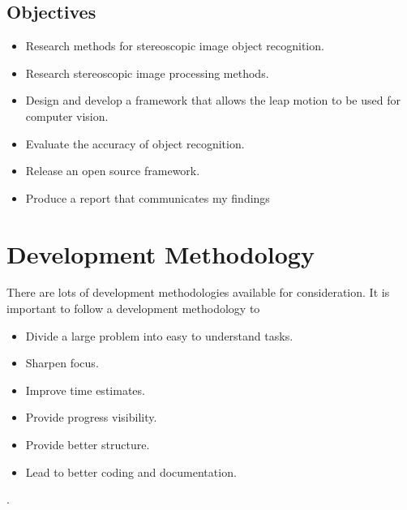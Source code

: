 \documentclass[11pt,oneside]{report}
\begin{document}
		\subsection{Objectives} 
		\begin{itemize}
			\item Research methods for stereoscopic image object recognition.
			\item Research stereoscopic image processing methods.
			\item Design and develop a framework that allows the leap motion to be used for computer vision.
			\item Evaluate the accuracy of object recognition.
			\item Release an open source framework.
			\item Produce a report that communicates my findings
		\end{itemize}
			
		\section{Development Methodology}
					There are lots of development methodologies available for consideration.
					It is important to follow a development methodology to
					\begin{itemize}
						\item Divide a large problem into easy to understand tasks.
						\item Sharpen focus.
						\item Improve time estimates.
						\item Provide progress visibility.
						\item Provide better structure.
						\item Lead to better coding and documentation.
					\end{itemize}\cite{book:dawson}.
					
\end{document}
